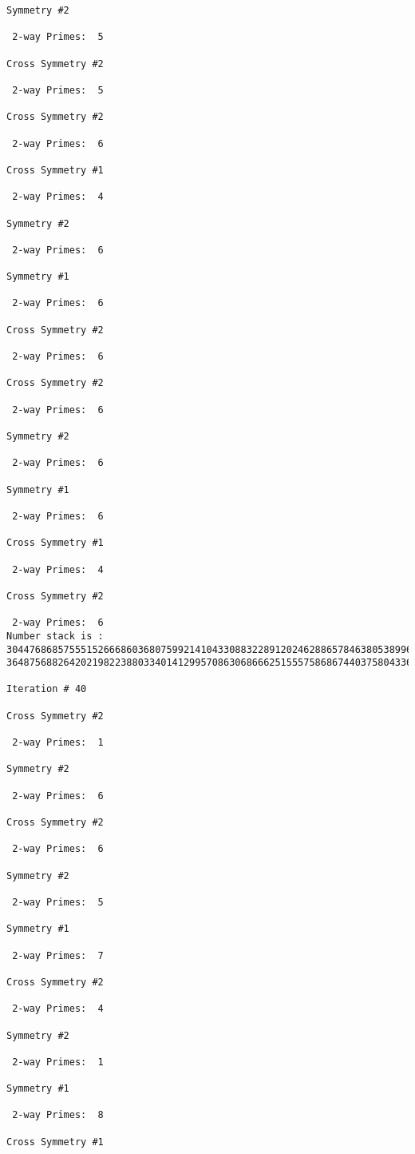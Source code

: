 {{{{\begin{verbatim}
Symmetry #2

 2-way Primes: 	5

Cross Symmetry #2

 2-way Primes: 	5

Cross Symmetry #2

 2-way Primes: 	6

Cross Symmetry #1

 2-way Primes: 	4

Symmetry #2

 2-way Primes: 	6

Symmetry #1

 2-way Primes: 	6

Cross Symmetry #2

 2-way Primes: 	6

Cross Symmetry #2

 2-way Primes: 	6

Symmetry #2

 2-way Primes: 	6

Symmetry #1

 2-way Primes: 	6

Cross Symmetry #1

 2-way Primes: 	4

Cross Symmetry #2

 2-way Primes: 	6
Number stack is :
30447686857555152666860368075992141043308832289120246288657846380538996794608835958544046240163340857
36487568826420219822388033401412995708630686662515557586867440375804336104264044585953880649769983508

Iteration #	40

Cross Symmetry #2

 2-way Primes: 	1

Symmetry #2

 2-way Primes: 	6

Cross Symmetry #2

 2-way Primes: 	6

Symmetry #2

 2-way Primes: 	5

Symmetry #1

 2-way Primes: 	7

Cross Symmetry #2

 2-way Primes: 	4

Symmetry #2

 2-way Primes: 	1

Symmetry #1

 2-way Primes: 	8

Cross Symmetry #1


\end{verbatim}}}}}
